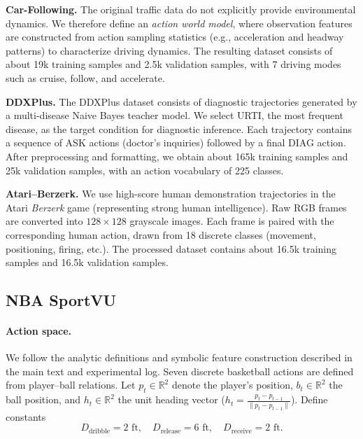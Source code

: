 \documentclass{article} %
\begin{document}
\textbf{Car-Following.}
The original traffic data do not explicitly provide environmental dynamics.
We therefore define an \emph{action world model}, where observation features are constructed
from action sampling statistics (e.g., acceleration and headway patterns) to characterize
driving dynamics. The resulting dataset consists of about 19k training samples and 2.5k
validation samples, with 7 driving modes such as cruise, follow, and accelerate.

\textbf{DDXPlus.}
The DDXPlus dataset consists of diagnostic trajectories generated by a multi-disease
Naive Bayes teacher model. We select URTI, the most frequent disease, as the target
condition for diagnostic inference. Each trajectory contains a sequence of ASK actions
(doctor’s inquiries) followed by a final DIAG action. After preprocessing and formatting,
we obtain about 165k training samples and 25k validation samples, with an action
vocabulary of 225 classes.

\textbf{Atari--Berzerk.}
We use high-score human demonstration trajectories in the Atari \emph{Berzerk} game
(representing strong human intelligence). Raw RGB frames are converted into
$128\times128$ grayscale images. Each frame is paired with the corresponding
human action, drawn from 18 discrete classes (movement, positioning, firing, etc.).
The processed dataset contains about 16.5k training samples and 16.5k validation samples.


\subsection{NBA SportVU}
\label{Sec:B2}
\paragraph{Action space.}
We follow the analytic definitions and symbolic feature construction described in the main text and experimental log. Seven discrete basketball actions are defined from player--ball relations. Let $p_t \in \mathbb{R}^2$ denote the player’s position, $b_t \in \mathbb{R}^2$ the ball position, and $h_t \in \mathbb{R}^2$ the unit heading vector ($h_t = \frac{p_t - p_{t-1}}{\|p_t - p_{t-1}\|}$). Define constants
\[
D_{\text{dribble}}=2\text{ ft}, \quad D_{\text{release}}=6\text{ ft}, \quad D_{\text{receive}}=2\text{ ft}.
\]
\end{document}
